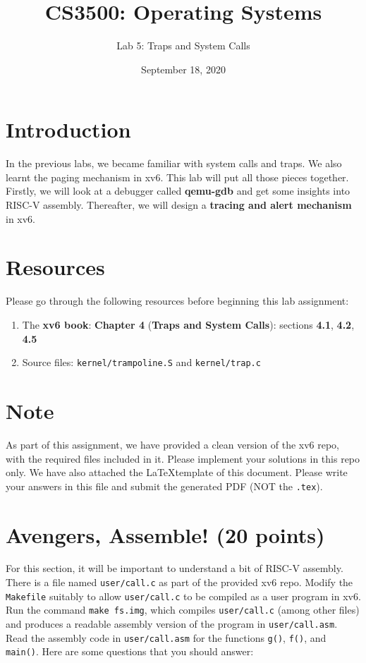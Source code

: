 \documentclass[11pt]{exam}
\title{\textbf{CS3500: Operating Systems}}
\subtitle{Lab 5: Traps and System Calls\vspace{-1em}}
\date{September 18, 2020}
\begin{document}
\maketitle

\section*{Introduction} In the previous labs, we became familiar with system calls and traps. We also learnt the paging mechanism in xv6. This lab will put all those pieces together. Firstly, we will look at a debugger called \textbf{qemu-gdb} and get some insights into RISC-V assembly. Thereafter, we will design a \textbf{tracing and alert mechanism} in xv6.

\section*{Resources} Please go through the following resources before beginning this lab assignment:
\begin{enumerate}
    \item The \textbf{xv6 book}: \textbf{Chapter 4} (\textbf{Traps and System Calls}): sections \textbf{4.1}, \textbf{4.2}, \textbf{4.5}
    \item Source files: \texttt{kernel/trampoline.S} and \texttt{kernel/trap.c}
\end{enumerate}

\section*{Note} As part of this assignment, we have provided a clean version of the xv6 repo, with the required files included in it. Please implement your solutions in this repo only. We have also attached the \LaTeX template of this document. Please write your answers in this file and submit the generated PDF (NOT the \texttt{.tex}). 

\section{Avengers, Assemble! (20 points)}
For this section, it will be important to understand a bit of RISC-V assembly. \\

\noindent There is a file named \texttt{user/call.c} as part of the provided xv6 repo. Modify the \texttt{Makefile} suitably to allow \texttt{user/call.c} to be compiled as a user program in xv6. Run the command \texttt{make fs.img}, which compiles \texttt{user/call.c} (among other files) and produces a readable assembly version of the program in \texttt{user/call.asm}. \noindent Read the assembly code in \texttt{user/call.asm} for the functions \texttt{g()}, \texttt{f()}, and \texttt{main()}. Here are some questions that you should answer:
\end{document}
